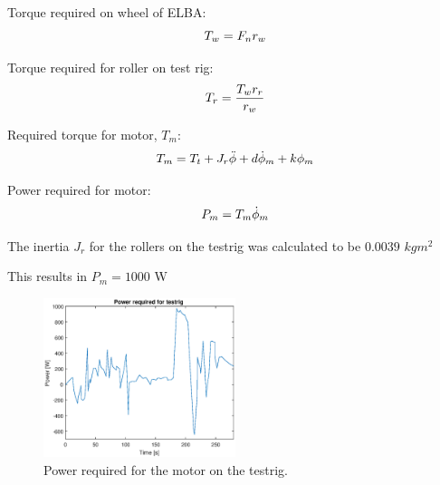 Torque required on wheel of ELBA: $$T_w = F_n\*r_w$$

Torque required for roller on test rig: $$T_r = \frac{T_w\*r_r}{r_w}$$

Required torque for motor, $T_m$: $$T_m = T_t + J_r\*\ddot{\phi} + d\*\dot{\phi}_m + k\*\phi_m$$

Power required for motor: $$P_m = T_m\*\dot{\phi}_m$$

The inertia $J_r$ for the rollers on the testrig was calculated to be $0.0039$ $kgm^2$

This results in $P_m = 1000$ W

\begin{figure}[H]
    \centering
    \label{fig:testrig_power_required}
    \includegraphics[width=0.5\textwidth]{./img/testrig_power_required.eps}
    \caption{Power required for the motor on the testrig.}
\end{figure}
